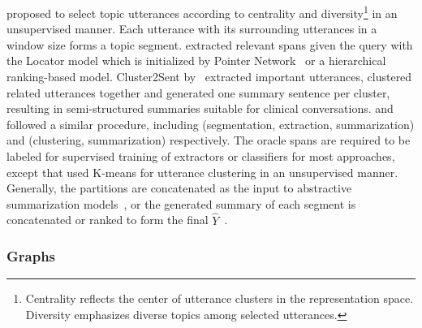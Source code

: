 \citet{zou2021unsupervised} proposed to select topic utterances according to 
centrality and diversity\footnote{Centrality reflects the center of utterance clusters in the representation space. Diversity emphasizes diverse topics among selected utterances.} in an unsupervised manner. Each utterance with its surrounding utterances in a window size forms a topic segment.
\citet{zhong2021qmsum} extracted relevant spans given the query with the Locator model which is initialized by Pointer Network~\cite{vinyals2015pointer} or a hierarchical ranking-based model. 
Cluster2Sent by~\citet{krishna2021generating} extracted important utterances, clustered related utterances together and generated one summary sentence per cluster, resulting in semi-structured summaries suitable for clinical conversations. 
\citet{banerjee2015generating} and \citet{shang2018unsupervised} followed a similar procedure, including (segmentation, extraction,  summarization) and (clustering, summarization) respectively.
The oracle spans are required to be labeled for supervised training of extractors or classifiers for most approaches, except that \citet{shang2018unsupervised} used K-means for utterance clustering in an unsupervised manner.
Generally, the partitions are concatenated as the input to abstractive summarization models~\cite{zhong2021qmsum}, or the generated summary of each segment is concatenated or ranked to form the final $\hat{Y}$~\cite{zou2021unsupervised,banerjee2015generating}.



\subsubsection{Graphs} 
\label{sec:graphs}

